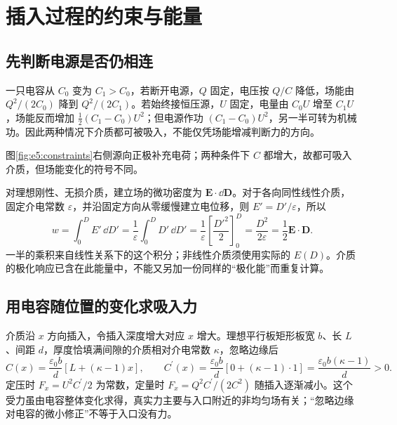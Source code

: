 \section{插入过程的约束与能量}
\subsection{先判断电源是否仍相连}

一只电容从 $C_0$ 变为 $C_1>C_0$，若断开电源，$Q$ 固定，电压按 $Q/C$ 降低，场能由 $Q^2/(2C_0)$ 降到 $Q^2/(2C_1)$。若始终接恒压源，$U$ 固定，电量由 $C_0U$ 增至 $C_1U$，场能反而增加 $\tfrac12(C_1-C_0)U^2$；但电源作功 $(C_1-C_0)U^2$，另一半可转为机械功。因此两种情况下介质都可被吸入，不能仅凭场能增减判断力的方向。

\par 图\ref{fig:e5:constraints}右侧源向正极补充电荷；两种条件下 $C$ 都增大，故都可吸入介质，但场能变化的符号不同。

对理想刚性、无损介质，建立场的微功密度为 $\bm E\cdot\dd\bm D$。对于各向同性线性介质，固定介电常数 $\varepsilon$，并沿固定方向从零缓慢建立电位移，则 $E'=D'/\varepsilon$，所以
\[
w=\int_0^D E'\,\dd D'
=\frac1\varepsilon\int_0^D D'\,\dd D'
=\frac1\varepsilon\left[\frac{D'^2}{2}\right]_0^D
=\frac{D^2}{2\varepsilon}
=\frac12\bm E\cdot\bm D.
\]
一半的乘积来自线性关系下的这个积分；非线性介质须使用实际的 $E(D)$。介质的极化响应已含在此能量中，不能又另加一份同样的“极化能”而重复计算。

\subsection{用电容随位置的变化求吸入力}

介质沿 $x$ 方向插入，令插入深度增大对应 $x$ 增大。理想平行板矩形板宽 $b$、长 $L$、间距 $d$，厚度恰填满间隙的介质相对介电常数 $\kappa$，忽略边缘后
\[
 C(x)=\frac{\varepsilon_0b}{d}[L+(\kappa-1)x],\qquad
 C^\prime(x)=\frac{\varepsilon_0b}{d}[0+(\kappa-1)\cdot1]
 =\frac{\varepsilon_0b(\kappa-1)}d>0.
\]
定压时 $F_x=U^2C^\prime/2$ 为常数，定量时 $F_x=Q^2C^\prime/(2C^2)$ 随插入逐渐减小。这个受力虽由电容整体变化求得，真实力主要与入口附近的非均匀场有关；“忽略边缘对电容的微小修正”不等于入口没有力。

